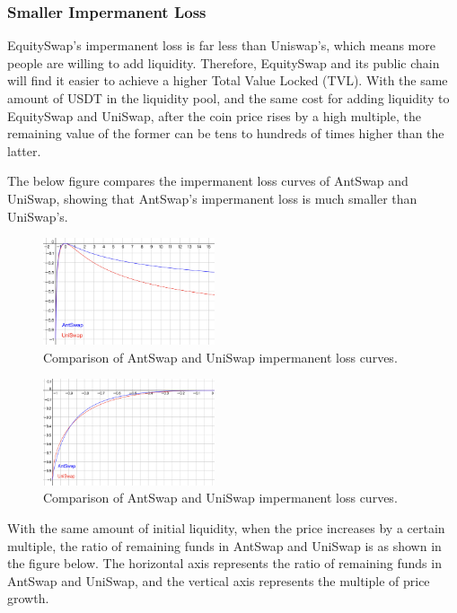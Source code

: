 \documentclass{article}
\begin{document}
\subsubsection{Smaller Impermanent Loss}

EquitySwap's impermanent loss is far less than Uniswap’s, which means more people are willing to add liquidity. Therefore, EquitySwap and its public chain will find it easier to achieve a higher Total Value Locked (TVL). With the same amount of USDT in the liquidity pool, and the same cost for adding liquidity to EquitySwap and UniSwap, after the coin price rises by a high multiple, the remaining value of the former can be tens to hundreds of times higher than the latter.

The below figure compares the impermanent loss curves of AntSwap and UniSwap, showing that AntSwap's impermanent loss is much smaller than UniSwap's.

\begin{figure}
\centering
\includegraphics[width=0.45\textwidth]{./img/impermanent_loss_curves_1.png}
\caption{\label{fig}Comparison of AntSwap and UniSwap impermanent loss curves.}
\end{figure}
\begin{figure}
\centering
\includegraphics[width=0.45\textwidth]{./img/impermanent_loss_curves_2.png}
\caption{\label{fig}Comparison of AntSwap and UniSwap impermanent loss curves.}
\end{figure}


With the same amount of initial liquidity, when the price increases by a certain multiple, the ratio of remaining funds in AntSwap and UniSwap is as shown in the figure below. The horizontal axis represents the ratio of remaining funds in AntSwap and UniSwap, and the vertical axis represents the multiple of price growth.
\end{document}
